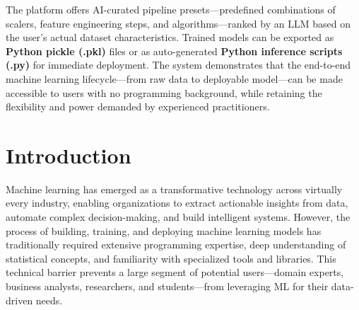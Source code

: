 \documentclass[12pt,a4paper]{report}
\begin{document}
The platform offers AI-curated pipeline presets—predefined combinations of scalers, feature engineering steps, and algorithms—ranked by an LLM based on the user's actual dataset characteristics. Trained models can be exported as \textbf{Python pickle (.pkl)} files or as auto-generated \textbf{Python inference scripts (.py)} for immediate deployment. The system demonstrates that the end-to-end machine learning lifecycle—from raw data to deployable model—can be made accessible to users with no programming background, while retaining the flexibility and power demanded by experienced practitioners.


\pagestyle{empty}

\tableofcontents


\clearpage

\listoffigures

\clearpage

\listoftables

\clearpage


\newpage
{}
\pagestyle{maincontent}
\setcounter{chapter}{1}
\clearpage
\thispagestyle{empty}

\noindent
{}

\clearpage

\section{Introduction}
Machine learning has emerged as a transformative technology across virtually every industry, enabling organizations to extract actionable insights from data, automate complex decision-making, and build intelligent systems. However, the process of building, training, and deploying machine learning models has traditionally required extensive programming expertise, deep understanding of statistical concepts, and familiarity with specialized tools and libraries. This technical barrier prevents a large segment of potential users—domain experts, business analysts, researchers, and students—from leveraging ML for their data-driven needs.
\end{document}
